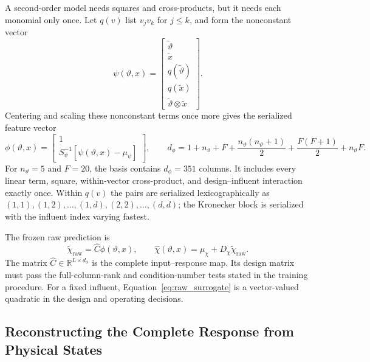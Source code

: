 \documentclass[a4paper,fleqn]{cas-sc}
\newcommand{\R}{\mathbb{R}}
\begin{document}
A second-order model needs squares and cross-products, but it needs each monomial only once. Let $q(v)$ list $v_jv_k$ for $j\leq k$, and form the nonconstant vector
\begin{equation}
\label{eq:unique_quadratic_terms}
\psi(\vartheta,x)=
\begin{bmatrix}
\widetilde\vartheta\\
\widetilde x\\
q(\widetilde\vartheta)\\
q(\widetilde x)\\
\widetilde\vartheta\otimes\widetilde x
\end{bmatrix}.
\end{equation}
Centering and scaling these nonconstant terms once more gives the serialized feature vector
\begin{equation}
\label{eq:system_feature_map}
\phi(\vartheta,x)=
\begin{bmatrix}
1\\S_\psi^{-1}[\psi(\vartheta,x)-\mu_\psi]
\end{bmatrix},
\qquad
d_\phi=1+n_\vartheta+F+\frac{n_\vartheta(n_\vartheta+1)}2+\frac{F(F+1)}2+n_\vartheta F.
\end{equation}
For $n_\vartheta=5$ and $F=20$, the basis contains $d_\phi=351$ columns. It includes every linear term, square, within-vector cross-product, and design--influent interaction exactly once. Within $q(v)$ the pairs are serialized lexicographically as $(1,1),(1,2),\ldots,(1,d),(2,2),\ldots,(d,d)$; the Kronecker block is serialized with the influent index varying fastest.

The frozen raw prediction is
\begin{equation}
\label{eq:raw_surrogate}
\widetilde\chi_{\mathrm{raw}}=\widehat C\phi(\vartheta,x),
\qquad
\widehat\chi(\vartheta,x)=\mu_\chi+D_\chi\widetilde\chi_{\mathrm{raw}}.
\end{equation}
The matrix $\widehat C\in\R^{L\times d_\phi}$ is the complete input--response map. Its design matrix must pass the full-column-rank and condition-number tests stated in the training procedure. For a fixed influent, Equation~\eqref{eq:raw_surrogate} is a vector-valued quadratic in the design and operating decisions.

\subsection{Reconstructing the Complete Response from Physical States}
\end{document}
